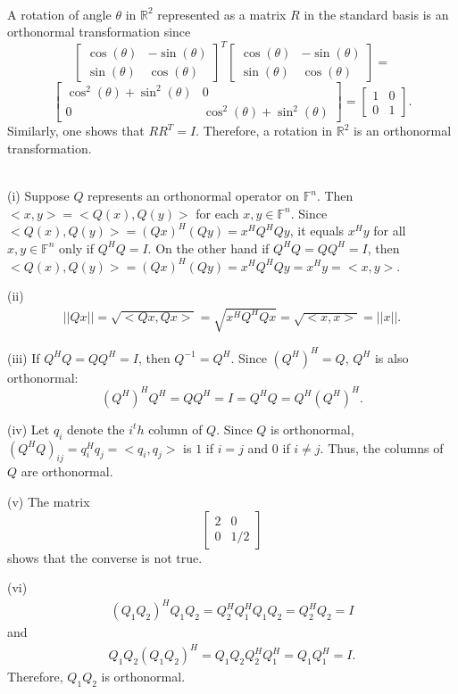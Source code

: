 \documentclass[letterpaper,12pt]{article}
\theoremstyle{definition}
\newenvironment{problem}[2][Problem]{\begin{trivlist}
\item[\hskip \labelsep {\bfseries #1}\hskip \labelsep {\bfseries #2.}]}{\end{trivlist}}
\begin{document}
\begin{problem}9~\\
A rotation of angle $\theta$ in $\mathbb R^2$ represented as a matrix $R$
in the standard basis is an orthonormal transformation since
\[
    \begin{bmatrix}
        \cos(\theta) & -\sin(\theta)\\
        \sin(\theta) & \cos(\theta)
    \end{bmatrix}^T
    \begin{bmatrix}
       \cos(\theta) & -\sin(\theta)\\
       \sin(\theta) & \cos(\theta)
    \end{bmatrix} =
\]
\[
    \begin{bmatrix}
        \cos^2(\theta)+\sin^2(\theta) & 0\\
        0 & \cos^2(\theta)+\sin^2(\theta)
    \end{bmatrix} =
    \begin{bmatrix}
        1 & 0\\
        0 & 1
    \end{bmatrix}.
 \]
Similarly, one shows that $RR^T=I$.
Therefore, a rotation in $\mathbb R^2$ is an orthonormal transformation.

\end{problem}
\begin{problem}{10}~\\
(i)
Suppose $Q$ represents an orthonormal operator on $\mathbb F^n$.
Then $<x,y>=<Q(x),Q(y)>$ for each $x,y\in\mathbb F^n$.
Since $<Q(x),Q(y)> = (Qx)^H(Qy)=x^HQ^HQy$, it equals $x^Hy$ for all $x,y\in\mathbb F^n$
only if $Q^HQ=I$.
On the other hand if $Q^HQ=QQ^H=I$, then
$<Q(x),Q(y)>=(Qx)^H(Qy)=x^HQ^HQy=x^Hy=<x,y>$.

(ii)
\begin{align*}
    ||Qx||=\sqrt{<Qx,Qx>}=\sqrt{x^HQ^HQx}=\sqrt{<x,x>}=||x||.
\end{align*}

(iii)
If $Q^HQ=QQ^H=I$, then $Q^{-1}=Q^H$.
Since $(Q^H)^H=Q$, $Q^H$ is also orthonormal:
\begin{equation*}
    (Q^H)^HQ^H=QQ^H=I=Q^HQ=Q^H(Q^H)^H.
\end{equation*}

(iv)
Let $q_i$ denote the $i^th$ column of $Q$.
Since $Q$ is orthonormal,
$(Q^HQ)_{ij}=q_i^Hq_j=<q_i,q_j>$ is $1$ if $i=j$ and $0$ if $i\neq j$.
Thus, the columns of $Q$ are orthonormal.

(v)
The matrix
\[\begin{bmatrix}
    2 & 0\\
    0 & 1/2
\end{bmatrix}\]
shows that the converse is not true.

(vi)
\begin{align*}
    (Q_1Q_2)^HQ_1Q_2=Q_2^HQ_1^HQ_1Q_2=Q_2^HQ_2=I
\end{align*}
and
\begin{align*}
     Q_1Q_2(Q_1Q_2)^H=Q_1Q_2Q_2^HQ_1^H=Q_1Q_1^H=I.
\end{align*}
Therefore, $Q_1Q_2$ is orthonormal.

\end{problem}
\end{document}
